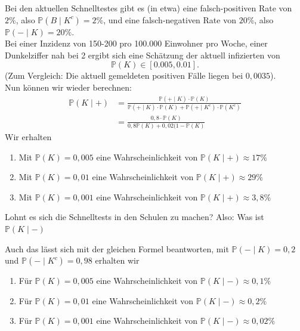 \begin{example}
    Bei den aktuellen Schnelltestes gibt es (in etwa) eine falsch-positiven Rate von $2\%$, also  $\mathbb{P}(B\mid K^{c}) = 2\%$, und eine falsch-negativen Rate von $20\%$, also  $\mathbb{P}(-\mid K) = 20\%$. \\
    Bei einer Inzidenz von 150-200 pro 100.000 Einwohner pro Woche, einer Dunkelziffer nah bei 2 ergibt sich eine Schätzung der aktuell infizierten von
    \[
        \mathbb{P}(K) \in [0.005, 0.01]
    .\] 
    (Zum Vergleich: Die aktuell gemeldeten positiven Fälle liegen bei $0,0035$). \\
    Nun können wir wieder berechnen:
    \[
                \begin{split}
                    \mathbb{P}(K\mid +) &= \frac{\mathbb{P}(+\mid K)\cdot \mathbb{P}(K)}{\mathbb{P}(+ \mid  K) \cdot \mathbb{P}(K) + \mathbb{P}(+ \mid K^{c}) \cdot  \mathbb{P}(K^{c})} \\
                                        &= \frac{0,8\cdot \mathbb{P}(K)}{0,8 \mathbb{P}(K) + 0,02 (1-\mathbb{P}(K)}
                \end{split}
            \]
            Wir erhalten
            \begin{enumerate}[label=\protect\circled{\alph*}]
                \item Mit $\mathbb{P}(K) = 0,005$ eine Wahrscheinlichkeit von $\mathbb{P}(K\mid +) \approx 17\%$
                \item Mit $\mathbb{P}(K) = 0,01$ eine Wahrscheinlichkeit von $\mathbb{P}(K\mid +) \approx 29\%$ 
                \item Mit $\mathbb{P}(K) = 0,001$ eine Wahrscheinlichkeit von $\mathbb{P}(K\mid +) \approx 3,8\%$
            \end{enumerate}
            \begin{question}
                Lohnt es sich die Schnelltests in den Schulen zu machen? Also: Was ist $\mathbb{P}(K\mid -)$
            \end{question}
            Auch das lässt sich mit der gleichen Formel beantworten, mit $\mathbb{P}(-\mid K) = 0,2$ und $\mathbb{P}(-\mid K^{c})=0,98$ erhalten wir
            \begin{enumerate}[label=\protect\circled{\alph*}]
                \item Für $\mathbb{P}(K) = 0,005$ eine Wahrscheinlichkeit von $\mathbb{P}(K\mid -) \approx 0,1\%$
                \item Für $\mathbb{P}(K) = 0,01 $ eine Wahrscheinlichkeit von $\mathbb{P}(K\mid -) \approx 0,2\%$
                \item Für $\mathbb{P}(K) = 0,001$ eine Wahrscheinlichkeit von $\mathbb{P}(K\mid -) \approx 0,02\%$
            \end{enumerate}
\end{example}












